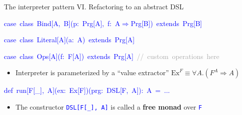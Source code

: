 \documentclass[english,,russian]{beamer}
\newenvironment{lyxcode}
  {\par\begin{list}{}{
    \setlength{\rightmargin}{\leftmargin}
    \setlength{\listparindent}{0pt}%
    \raggedright
    \setlength{\itemsep}{0pt}
    \setlength{\parsep}{0pt}
    \normalfont\ttfamily}%
   \def\{{\char`\{}
   \def\}{\char`\}}
   \def\textasciitilde{\char`\~}
   \item[]}
  {\end{list}}
\begin{document}
\begin{frame}{The interpreter pattern VI. Refactoring to an abstract DSL}
\begin{lyxcode}
\textcolor{blue}{\footnotesize{}case~class~Bind{[}A,~B{]}(p:~Prg{[}A{]},~f:~A$\Rightarrow$Prg{[}B{]})~extends~Prg{[}B{]}}{\footnotesize\par}

\textcolor{blue}{\footnotesize{}case~class~Literal{[}A{]}(a:~A)~extends~Prg{[}A{]}}{\footnotesize\par}

\textcolor{blue}{\footnotesize{}case~class~Ops{[}A{]}(f:~F{[}A{]})~extends~Prg{[}A{]}}\textcolor{darkgray}{\footnotesize{}~//~custom~operations~here}{\footnotesize\par}
\end{lyxcode}
\begin{itemize}
\item Interpreter is parameterized by a ``value extractor'' $\text{Ex}^{F}\equiv\forall A.\left(F^{A}\Rightarrow A\right)$
\end{itemize}
\begin{lyxcode}
\textcolor{blue}{\footnotesize{}def~run{[}F{[}\_{]},~A{]}(ex:~Ex{[}F{]})(prg:~DSL{[}F,~A{]}):~A~=~...}{\footnotesize\par}
\end{lyxcode}
\begin{itemize}
\item The constructor \texttt{\textcolor{blue}{\footnotesize{}DSL{[}F{[}\_{]},
A{]}}} is called a \textbf{free monad} over \texttt{\textcolor{blue}{\footnotesize{}F}} 
\end{itemize}
\end{frame}
\end{document}
